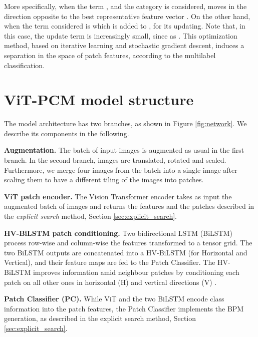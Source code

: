\documentclass[runningheads]{styles/llncs}
\begin{document}
More specifically, when the term ,  and the category  is considered,    moves in the direction opposite to the best representative feature vector . On the other hand, when   the term considered is  which is added to , for its  updating. Note that, in this case,  the update term is increasingly small, since  as .  
This optimization method, based on iterative learning and stochastic gradient descent, induces a separation in the space of patch features, according to the multilabel classification.


 
\section{ViT-PCM model  structure}\label{sec:architecture}



The model architecture has two branches, as shown in Figure \ref{fig:network}. We describe its components in the following.


\noindent
{\bf Augmentation.} The batch of input images is augmented as usual in the first branch. In the second branch, images are translated, rotated and scaled. Furthermore, we merge four images from the batch into a single image after scaling them to have a different tiling of the images into patches.  


 
 \noindent
{\bf ViT patch encoder.} The Vision Transformer encoder takes as input the augmented batch of images and returns the features  and the  patches described in the {\em explicit search} method, Section \ref{sec:explicit_search}.

\noindent
{\bf HV-BiLSTM patch conditioning.} Two bidirectional LSTM (BiLSTM) process row-wise and   column-wise  the features  transformed to a tensor grid.  The two BiLSTM outputs are concatenated into a HV-BiLSTM (for Horizontal and Vertical), and their feature maps  are fed to the Patch Classifier. The HV-BiLSTM improves information amid neighbour patches by conditioning each patch on all other ones in horizontal (H)  and vertical directions (V) \cite{van2016pixel}.  
 


\noindent
{\bf Patch Classifier (PC).} While ViT and the two BiLSTM encode class information into the patch features, the Patch Classifier  implements the BPM generation, as described in the explicit search method, Section \ref{sec:explicit_search}. 
\end{document}
